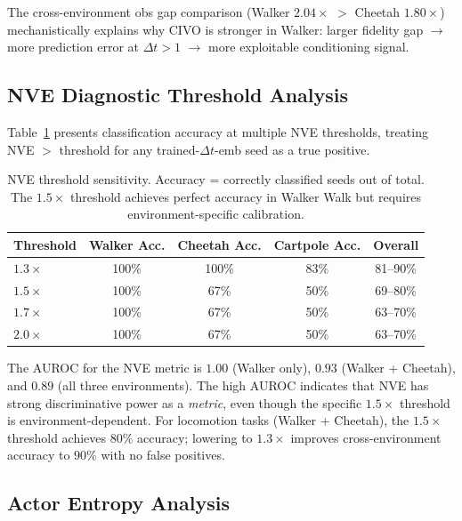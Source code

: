 \documentclass[10pt,letterpaper]{article}
\newcommand{\dt}{\Delta t}
\begin{document}
The cross-environment obs gap comparison (Walker $2.04\times$ $>$ Cheetah $1.80\times$) mechanistically explains why CIVO is stronger in Walker: larger fidelity gap $\rightarrow$ more prediction error at $\dt{>}1$ $\rightarrow$ more exploitable conditioning signal.

\subsection{NVE Diagnostic Threshold Analysis}
\label{sec:nve_threshold}

Table~\ref{tab:threshold} presents classification accuracy at multiple NVE thresholds, treating NVE $>$ threshold for any trained-$\dt$-emb seed as a true positive.

\begin{table}[h]
\centering
\caption{NVE threshold sensitivity. Accuracy = correctly classified seeds out of total. The $1.5\times$ threshold achieves perfect accuracy in Walker Walk but requires environment-specific calibration.}
\label{tab:threshold}
\small
\begin{tabular}{lcccc}
\toprule
Threshold & Walker Acc. & Cheetah Acc. & Cartpole Acc. & Overall \\
\midrule
$1.3\times$ & 100\% & 100\% & 83\% & 81--90\% \\
$1.5\times$ & 100\% &  67\% & 50\% & 69--80\% \\
$1.7\times$ & 100\% &  67\% & 50\% & 63--70\% \\
$2.0\times$ & 100\% &  67\% & 50\% & 63--70\% \\
\bottomrule
\end{tabular}
\end{table}

The AUROC for the NVE metric is $1.00$ (Walker only), $0.93$ (Walker + Cheetah), and $0.89$ (all three environments).
The high AUROC indicates that NVE has strong discriminative power as a \emph{metric}, even though the specific $1.5\times$ threshold is environment-dependent.
For locomotion tasks (Walker + Cheetah), the $1.5\times$ threshold achieves $80\%$ accuracy; lowering to $1.3\times$ improves cross-environment accuracy to $90\%$ with no false positives.

\subsection{Actor Entropy Analysis}
\label{sec:entropy}
\end{document}

